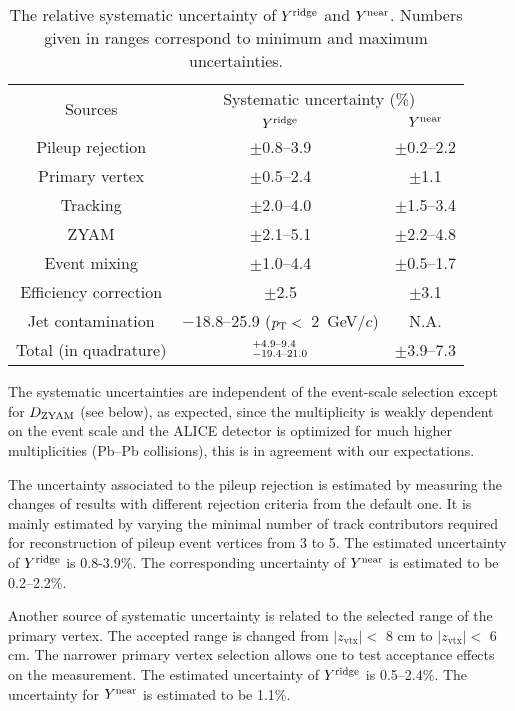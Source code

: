 \begin{table}[h!]
\caption{The relative systematic uncertainty of $Y^{\rm{ridge}}$ and $Y^{\rm{near}}$. Numbers given in ranges correspond to minimum and maximum uncertainties.}
\centering
\begin{tabular}{c|cc}
\hline 
\multirow{2}{*}{Sources}  & \multicolumn{2}{c}{Systematic uncertainty (\%)} \\\cline{2-3} 
         & $Y^{\rm{ridge}}$ & $Y^{\rm{near}}$ \\ \hline 
Pileup rejection    	& $\pm$0.8--3.9    &$\pm$0.2--2.2	\\ 
Primary vertex	        & $\pm$0.5--2.4	   &$\pm$1.1	\\ 
Tracking		        & $\pm$2.0--4.0    &$\pm$1.5--3.4	\\ 
ZYAM		        	& $\pm$2.1--5.1	   &$\pm$2.2--4.8	\\ 
Event mixing	    	& $\pm$1.0--4.4	   &$\pm$0.5--1.7	\\ 
Efficiency correction	& $\pm$2.5 	    &$\pm$3.1	\\  
Jet contamination   	& $-$18.8--25.9 ($p_\mathrm{T}<$~2~GeV/$c$)	&N.A.	\\ \hline 
Total (in quadrature)			& $^{+\rm{4.9}\textrm{--}\rm{9.4}}_{-\rm{19.4}\textrm{--}\rm{21.0}}$ & $\pm$3.9--7.3 \\ 
\hline 
\end{tabular}
\label{tab:syst}
\end{table}

The systematic uncertainties are independent of the event-scale selection except for $D_{\rm{ZYAM}}$ (see below), as expected, since the multiplicity is weakly dependent on the event scale and the ALICE detector is optimized for much higher multiplicities (Pb--Pb collisions), this is in agreement with our expectations.

The uncertainty associated to the pileup rejection is estimated by measuring the changes of results with different rejection criteria from the default one. It is mainly estimated by varying the minimal number of track contributors required for reconstruction of pileup event vertices from 3 to 5. The estimated uncertainty of $Y^{\rm{ridge}}$ is 0.8-3.9\%. The corresponding uncertainty of $Y^{\rm{near}}$ is estimated to be 0.2--2.2\%.
 
Another source of systematic uncertainty is related to the selected range of the primary vertex. The accepted range is changed from $|z_\mathrm{vtx}|<$ 8 cm to $|z_\mathrm{vtx}|<$ 6 cm. The narrower primary vertex selection allows one to test acceptance effects on the measurement. The estimated uncertainty of $Y^{\rm{ridge}}$ is 0.5--2.4\%. The uncertainty for $Y^{\rm{near}}$ is estimated to be 1.1\%.

